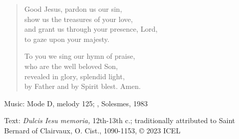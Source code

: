 \hymn



\setlength{\vleftmargin}{2em}
\begin{verse}
Good Jesus, pardon us our sin,\\
show us the treasures of your love,\\
and grant us through your presence, Lord,\\
to gaze upon your majesty.

To you we sing our hymn of praise,\\
who are the well beloved Son,\\
revealed in glory, splendid light,\\
by Father and by Spirit blest. Amen.
\end{verse}
\setlength{\vleftmargin}{\defleftmargini}

\begin{hymnsource}
Music: Mode D, melody 125; , Solesmes, 1983

Text: \emph{Dulcis Iesu memoria,} 12th-13th c.; traditionally attributed to Saint Bernard of Clairvaux, O. Cist., 1090-1153, © 2023 ICEL
\end{hymnsource}
